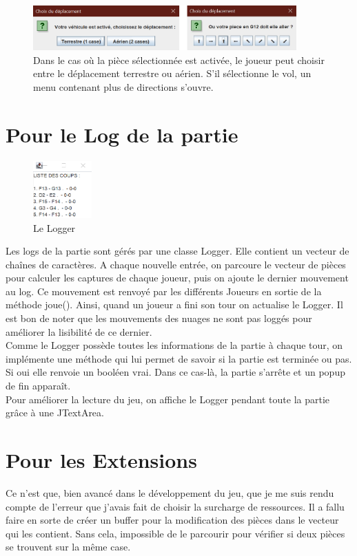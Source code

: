 \documentclass[titlepage]{report}
\begin{document}
\begin{figure}[h]
    \centering
    \includegraphics[width=0.9\textwidth]{img/choix_vol.png}
    \caption{Dans le cas où la pièce sélectionnée est activée, le joueur peut choisir entre le déplacement terrestre ou aérien. S’il sélectionne le vol, un menu contenant plus de directions s’ouvre.}
\end{figure}

\section{Pour le Log de la partie}
\begin{figure}[h]
    \centering
    \includegraphics[width=0.2\textwidth]{img/log.PNG}
    \caption{Le Logger}
\end{figure}
Les logs de la partie sont gérés par une classe Logger. Elle contient un vecteur de chaînes de caractères. A chaque nouvelle entrée, on parcoure le vecteur de pièces pour calculer les captures de chaque joueur, puis on ajoute le dernier mouvement au log. Ce mouvement est renvoyé par les différents Joueurs en sortie de la méthode joue(). Ainsi, quand un joueur a fini son tour on actualise le Logger. Il est bon de noter que les mouvements des nuages ne sont pas loggés pour améliorer la lisibilité de ce dernier.\\

Comme le Logger possède toutes les informations de la partie à chaque tour, on implémente une méthode qui lui permet de savoir si la partie est terminée ou pas. Si oui elle renvoie un booléen vrai. Dans ce cas-là, la partie s’arrête et un popup de fin apparaît.\\

Pour améliorer la lecture du jeu, on affiche le Logger pendant toute la partie grâce à une JTextArea. 

\section{Pour les Extensions}
Ce n’est que, bien avancé dans le développement du jeu, que je me suis rendu compte de l’erreur que j’avais fait de choisir la surcharge de ressources. Il a fallu faire en sorte de créer un buffer pour la modification des pièces dans le vecteur qui les contient. Sans cela, impossible de le parcourir pour vérifier si deux pièces se trouvent sur la même case. \\
\end{document}
